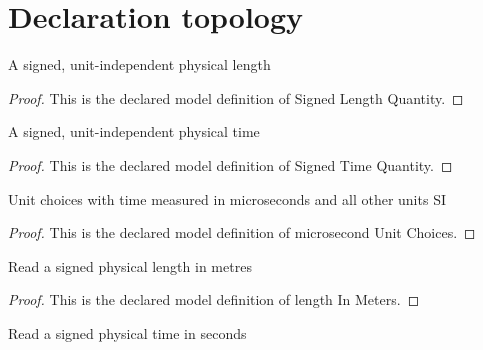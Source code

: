 \section{Declaration topology}
\begin{definition}
  \label{def:physics:phyx-mini-0598:phyxminiproblems-problemphyxmini0598-signedlengthquantity}
  A signed, unit-independent physical length
\end{definition}
\begin{proof}
  This is the declared model definition of Signed Length Quantity.
\end{proof}
\begin{definition}
  \label{def:physics:phyx-mini-0598:phyxminiproblems-problemphyxmini0598-signedtimequantity}
  A signed, unit-independent physical time
\end{definition}
\begin{proof}
  This is the declared model definition of Signed Time Quantity.
\end{proof}
\begin{definition}
  \label{def:physics:phyx-mini-0598:phyxminiproblems-problemphyxmini0598-microsecondunitchoices}
  Unit choices with time measured in microseconds and all other units SI
\end{definition}
\begin{proof}
  This is the declared model definition of microsecond Unit Choices.
\end{proof}
\begin{definition}
  \label{def:physics:phyx-mini-0598:phyxminiproblems-problemphyxmini0598-lengthinmeters}
  Read a signed physical length in metres
\end{definition}
\begin{proof}
  This is the declared model definition of length In Meters.
\end{proof}
\begin{definition}
  \label{def:physics:phyx-mini-0598:phyxminiproblems-problemphyxmini0598-timeinseconds}
  Read a signed physical time in seconds
\end{definition}
